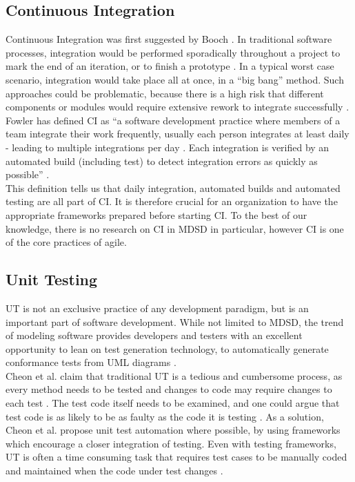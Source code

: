 \documentclass[fina_report_innit.tex]{subfiles}
\begin{document}
\subsection{Continuous Integration}
Continuous Integration was first suggested by Booch \cite{booch2006object}. In traditional software processes, integration would be performed sporadically throughout a project to mark the end of an iteration, or to finish a prototype \cite{booch2006object}. In a typical worst case scenario, integration would take place all at once, in a “big bang” method. Such approaches could be problematic, because there is a high risk that different components or modules would require extensive rework to integrate successfully \cite{booch2006object}.
\\

Fowler has defined CI as “a software development practice where members of a team  integrate  their  work  frequently,  usually  each person  integrates  at  least  daily  -  leading  to  multiple integrations per day \cite{fowler2006continuous}. Each integration is verified by an automated build (including test) to detect integration errors as quickly as possible” \cite{fowler2006continuous}.
\\

This definition tells us that daily integration, automated builds and automated testing are all part of CI. It is therefore crucial for an organization to have the appropriate frameworks prepared before starting CI. To the best of our knowledge, there is no research on CI in MDSD in particular, however CI is one of the core practices of agile.

\subsection{Unit Testing}
UT is not an exclusive practice of any development paradigm, but is an important part of software development. While not limited to MDSD, the trend of modeling software provides developers and testers with an excellent opportunity to lean on test generation technology, to automatically generate conformance tests from UML diagrams \cite{mussa2009survey}\cite{hartmann2004uml}.  
\\

Cheon et al. claim that traditional UT is a tedious and cumbersome process, as every method needs to be tested and changes to code may require changes to each test \cite{cheon2002simple}. The test code itself needs to be examined, and one could argue that test code is as likely to be as faulty as the code it is testing \cite{cheon2002simple}. As a solution, Cheon et al. propose unit test automation where possible, by using frameworks which encourage a closer integration of testing. Even with testing frameworks, UT is often a time consuming task that requires test cases to be manually coded and maintained when the code under test changes \cite{cheon2002simple}.
\\
\end{document}
